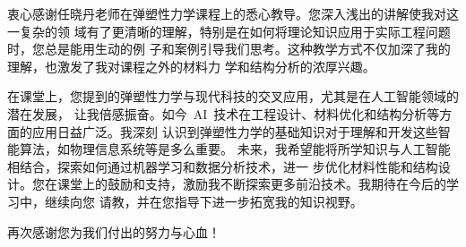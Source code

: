 衷心感谢任晓丹老师在弹塑性力学课程上的悉心教导。您深入浅出的讲解使我对这一复杂的领
域有了更清晰的理解，特别是在如何将理论知识应用于实际工程问题时，您总是能用生动的例
子和案例引导我们思考。这种教学方式不仅加深了我的理解，也激发了我对课程之外的材料力
学和结构分析的浓厚兴趣。

在课堂上，您提到的弹塑性力学与现代科技的交叉应用，尤其是在人工智能领域的潜在发展，
让我倍感振奋。如今~AI~技术在工程设计、材料优化和结构分析等方面的应用日益广泛。我深刻
认识到弹塑性力学的基础知识对于理解和开发这些智能算法，如物理信息系统等是多么重要。
未来，我希望能将所学知识与人工智能相结合，探索如何通过机器学习和数据分析技术，进一
步优化材料性能和结构设计。您在课堂上的鼓励和支持，激励我不断探索更多前沿技术。我期待在今后的学习中，继续向您
请教，并在您指导下进一步拓宽我的知识视野。

再次感谢您为我们付出的努力与心血！